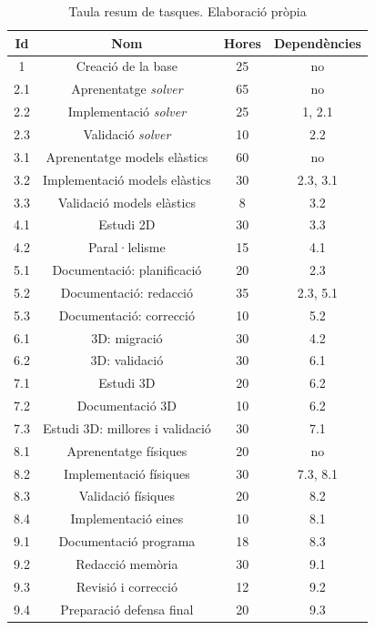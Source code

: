 \documentclass[a4paper]{report}
\begin{document}
	\begin{table}[h!]
		\centering
		\begin{tabular}{|| c || c | c c||}
			\hline
			\textbf{Id} & \textbf{Nom} & \textbf{Hores} & \textbf{Dependències} \\ 
			\hline\hline
			1 & Creació de la base & 25 & no \\
			\hline
			2.1 & Aprenentatge \textit{solver} & 65 & no \\
			2.2 & Implementació \textit{solver} & 25 & 1, 2.1 \\
			2.3 & Validació \textit{solver} & 10 & 2.2 \\
			\hline
			3.1 & Aprenentatge models elàstics & 60 & no \\
			3.2 & Implementació models elàstics & 30 & 2.3, 3.1 \\
			3.3 & Validació models elàstics & 8 & 3.2 \\
			\hline
			4.1 & Estudi 2D & 30 & 3.3 \\
			4.2 & Paral·lelisme & 15 & 4.1 \\
			\hline
			5.1 & Documentació: planificació & 20 & 2.3 \\
			5.2 & Documentació: redacció & 35 & 2.3, 5.1 \\
			5.3 & Documentació: correcció & 10 & 5.2 \\
			\hline
			6.1 & 3D: migració & 30 & 4.2 \\
			6.2 & 3D: validació & 30 & 6.1 \\
			\hline
			7.1 & Estudi 3D & 20 & 6.2 \\
			7.2 & Documentació 3D & 10 & 6.2 \\
			7.3 & Estudi 3D: millores i validació & 30 & 7.1 \\
			\hline
			8.1 & Aprenentatge físiques & 20 & no \\
			8.2 & Implementació físiques & 30 & 7.3, 8.1 \\
			8.3 & Validació físiques & 20 & 8.2 \\
			8.4 & Implementació eines & 10 & 8.1 \\
			\hline
			9.1 & Documentació programa & 18 & 8.3 \\
			9.2 & Redacció memòria & 30 & 9.1 \\
			9.3 & Revisió i correcció & 12 & 9.2 \\
			9.4 & Preparació defensa final & 20 & 9.3 \\
			\hline
		\end{tabular}
	\caption[Taula resum de tasques]{Taula resum de tasques. Elaboració pròpia}
	\label{table:resumTasques}
	\end{table}
	
\end{document}
